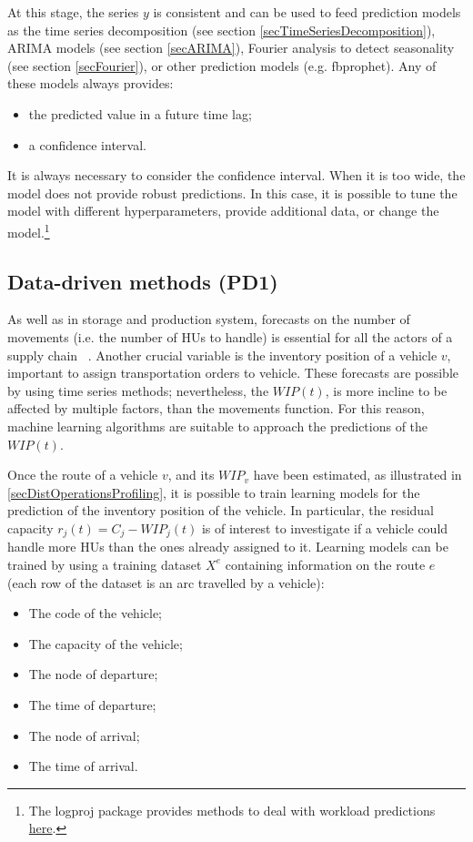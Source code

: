 At this stage, the series $y$ is consistent and can be used to feed prediction models as the time series decomposition (see section \ref{secTimeSeriesDecomposition}), ARIMA models (see section \ref{secARIMA}), Fourier analysis to detect seasonality (see section \ref{secFourier}), or other prediction models (e.g. fbprophet). Any of these models always provides:
\begin{itemize}
    \item the predicted value in a future time lag;
    \item a confidence interval.

\end{itemize}

It is always necessary to consider the confidence interval. When it is too wide, the model does not provide robust predictions. In this case, it is possible to tune the model with different hyperparameters, provide additional data, or change the model.\footnote{The logproj package provides methods to deal with workload predictions \href{https://github.com/aletuf93/logproj/blob/master/examples/LOG_02\%20Demand\%20prediction.ipynb}{here}.}


\subsection{Data-driven methods (PD1)}

As well as in storage and production system, forecasts on the number of movements (i.e. the number of HUs to handle) is essential for all the actors of a supply chain ~\cite{Moon2019}. Another crucial variable is the inventory position of a vehicle $v$, important to assign transportation orders to vehicle. These forecasts are possible by using time series methods; nevertheless, the $WIP(t)$, is more incline to be affected by multiple factors, than the movements function. For this reason, machine learning algorithms are suitable to approach the predictions of the $WIP(t)$.\par

Once the route of a vehicle $v$, and its $WIP_v$ have been estimated, as illustrated in \ref{secDistOperationsProfiling}, it is possible to train learning models for the prediction of the inventory position of the vehicle. In particular, the residual capacity $r_j\left(t\right)=C_j-WIP_j(t)$ is of interest to investigate if a vehicle could handle more HUs than the ones already assigned to it. Learning models can be trained by using a training dataset $X^e$ containing information on the route $e$ (each row of the dataset is an arc travelled by a vehicle):
\begin{itemize}
    \item The code of the vehicle;
    \item The capacity of the vehicle;
    \item The node of departure;
    \item The time of departure;
    \item The node of arrival;
    \item The time of arrival.

\end{itemize}

